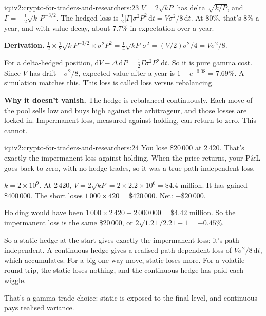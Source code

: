 \begin{solution}{iq:iv2:crypto-for-traders-and-researchers:23}
$V = 2\sqrt{kP}$ has delta $\sqrt{k/P}$, and $\Gamma = -\tfrac12\sqrt{k}\,P^{-3/2}$. The hedged loss is $\tfrac12|\Gamma|\sigma^2P^2\,\mathrm{d}t = V\sigma^2/8\,\mathrm{d}t$. At 80\%, that's 8\% a year, and with value decay, about 7.7\% in expectation over a year.

\textbf{Derivation.} $\tfrac12 \times \tfrac12\sqrt{k}P^{-3/2} \times \sigma^2P^2 = \tfrac14\sqrt{kP}\,\sigma^2 = (V/2)\sigma^2/4 = V\sigma^2/8$.

For a delta-hedged position, $\mathrm{d}V - \Delta\,\mathrm{d}P = \tfrac12\Gamma\sigma^2P^2\,\mathrm{d}t$. So it is pure gamma cost. Since $V$ has drift $-\sigma^2/8$, expected value after a year is $1 - e^{-0.08} = 7.69\%$. A simulation matches this. This loss is called loss versus rebalancing.

\textbf{Why it doesn't vanish.} The hedge is rebalanced continuously. Each move of the pool sells low and buys high against the arbitrageur, and those losses are locked in. Impermanent loss, measured against holding, can return to zero. This cannot.

\end{solution}

\begin{solution}{iq:iv2:crypto-for-traders-and-researchers:24}
You lose \$20\,000 at 2\,420. That's exactly the impermanent loss against holding. When the price returns, your P\&L goes back to zero, with no hedge trades, so it was a true path-independent loss.

$k = 2 \times 10^9$. At 2\,420, $V = 2\sqrt{kP} = 2 \times 2.2 \times 10^6 = \$4.4$ million. It has gained \$400\,000. The short loses $1\,000 \times 420 = \$420\,000$. Net: $-\$20\,000$.

Holding would have been $1\,000 \times 2\,420 + 2\,000\,000 = \$4.42$ million. So the impermanent loss is the same \$20\,000, or $2\sqrt{1.21}/2.21 - 1 = -0.45\%$.

So a static hedge at the start gives exactly the impermanent loss: it's path-independent. A continuous hedge gives a realised path-dependent loss of $V\sigma^2/8\,\mathrm{d}t$, which accumulates. For a big one-way move, static loses more. For a volatile round trip, the static loses nothing, and the continuous hedge has paid each wiggle.

That's a gamma-trade choice: static is exposed to the final level, and continuous pays realised variance.

\end{solution}

